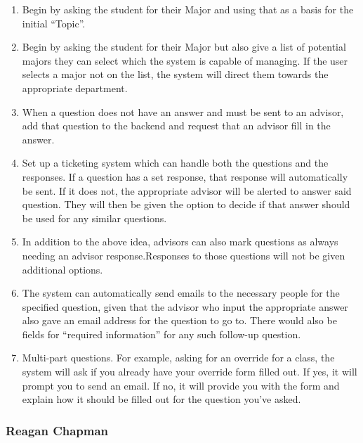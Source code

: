\documentclass[titlepage, 12pt]{article}
\begin{document}
\begin{enumerate}
    \item Begin by asking the student for their Major and using that as a basis for the initial “Topic”.
    \item Begin by asking the student for their Major but also give a list of potential majors they can select which the system is capable of managing. If the user selects a major not on the list, the system will direct them towards the appropriate department.
    \item When a question does not have an answer and must be sent to an advisor, add that question to the backend and request that an advisor fill in the answer.
    \item Set up a ticketing system which can handle both the questions and the responses. If a question has a set response, that response will automatically be sent. If it does not, the appropriate advisor will be alerted to answer said question. They will then be given the option to decide if that answer should be used for any similar questions.
    \item In addition to the above idea, advisors can also mark questions as always needing an advisor response.Responses to those questions will not be given additional options.
    \item The system can automatically send emails to the necessary people for the specified question, given that the advisor who input the appropriate answer also gave an email address for the question to go to. There would also be fields for “required information” for any such follow-up question.
    \item Multi-part questions. For example, asking for an override for a class, the system will ask if you already have your override form filled out. If yes, it will prompt you to send an email. If no, it will provide you with the form and explain how it should be filled out for the question you’ve asked.
\end{enumerate}

\subsubsection{Reagan Chapman}
\end{document}
